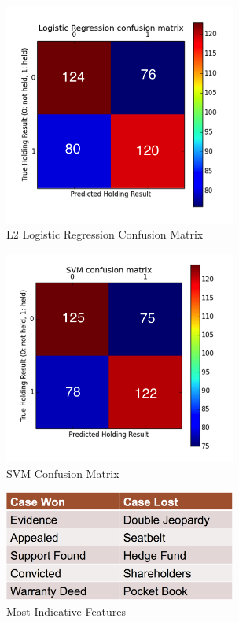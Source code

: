 \documentclass[journal]{IEEEtran}
\begin{document}
\begin{figure}
    \centering
    \includegraphics[width=3in]{logregConfusion.png}
    \caption{L2 Logistic Regression Confusion Matrix}
    \label{fig:logReg}
\end{figure}

\begin{figure}
    \centering
    \includegraphics[width=3in]{svmConfusion.png}
    \caption{SVM Confusion Matrix}
    \label{fig:SVM}
\end{figure}

\begin{figure}
    \centering
    \includegraphics[width=3in]{mostIndicativeFeatures.png}
    \caption{Most Indicative Features}
    \label{fig:msf}
\end{figure}
\end{document}
